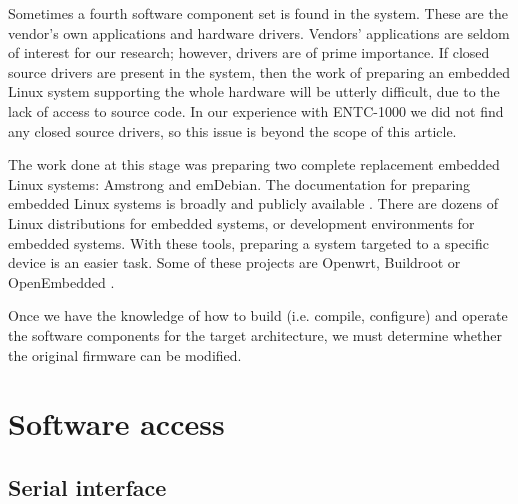 \documentclass[conference]{IEEEtran}
\newcommand{\nota}[1]{}
\begin{document}
Sometimes a fourth software component set is found in the system. These are the vendor's own applications and hardware drivers. Vendors' applications are seldom of interest for our research; however, drivers are of prime importance. If closed source drivers are present in the system, then the work of preparing an embedded Linux system supporting the whole hardware will be utterly difficult, due to the lack of access to source code. In our experience with ENTC-1000 we did not find any closed source drivers, so this issue is beyond the scope of this article.
 
\nota{
El trabajo realizado en este punto fue la preparación
de dos sistemas Linux embebidos completos de reemplazo: Amstrong y emDebian.
La documentación para preparar sistemas Linux embebidos es amplia y públicamente
disponible (referencias). Además, existen decenas de
distribuciones Linux para embebidos,
o entornos de desarrollo de distribuciones Linux para embebidos 
\footnote{No confundir distribución con entorno de desarrollo}. Estas herramientas
facilitan la preparación de un sistema para un dispositivo específico.
Algunas de estos proyectos son Openwrt, Buildroot, u OpenEmbedded (referencias).

Una vez que se tiene el conocimiento en cómo construir (compilar y configurar)
y operar los componentes de software para la arquitectura destino, se
debe realizar un análisis de si es posible o no modificar el firmware original.
}

The work done at this stage was preparing two complete replacement embedded Linux systems: Amstrong and emDebian. The documentation for preparing embedded Linux systems is broadly and publicly available \cite{emb1, emb2, freeelectron}. There are dozens of Linux distributions for embedded systems, or development environments for embedded systems. With these tools, preparing a system targeted to a specific device is an easier task. Some of these projects are Openwrt, Buildroot or OpenEmbedded \cite{openwrt, openembedded, buildroot}.

Once we have the knowledge of how to build (i.e. compile, configure) and operate the software components for the target architecture, we must determine whether the original firmware can be modified.

\section{Software access}

\subsection{Serial interface}
\nota {
Existen varias posibilidades para conectarse a un dispositivo 
Linux embebido, pero una de las disponibles, mas comúnmente encontrada es
a través de una consola serial. En los sistemas Linux, la 
consola serial permite ver los mensajes de error del kernel,
y también interactuar con el gestor de arranque.
}
\end{document}
